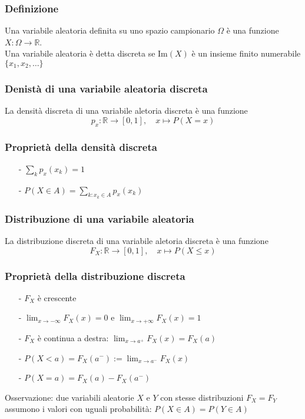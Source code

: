 \documentclass[a4paper]{article}
\newcommand\R{\mathbb{R}}     %
\begin{document}
\subsubsection*{Definizione}
Una variabile aleatoria definita su uno spazio campionario \(\Omega\) è una funzione \(X: \Omega \to \R\). \\
Una variabile aleatoria è detta discreta se \(\text{Im}(X)\) è un insieme finito numerabile \(\{x_1, x_2, \dots\}\)

\subsubsection*{Denistà di una variabile aleatoria discreta}
La densità discreta di una variabile aletoria discreta è una funzione \[p_x : \R \to [0,1], \quad x \mapsto P(X = x)\]

\subsubsection*{Proprietà della densità discreta}
\begin{itemize}[topsep=3pt, itemsep=0pt]
	\item[-] \(\displaystyle \sum_k p_x(x_k) = 1\)
	\item[-] \(\displaystyle P(X \in A) = \sum_{k : x_k \in A} p_x(x_k)\)
\end{itemize}

\subsubsection*{Distribuzione di una variabile aleatoria}
La distribuzione discreta di una variabile aletoria discreta è una funzione \[F_X : \R \to [0,1], \quad x \mapsto P(X \leq x)\]

\subsubsection*{Proprietà della distribuzione discreta}
\begin{itemize}[topsep=3pt, itemsep=0pt]
	\item[-] \(F_X\) è crescente
	\item[-] \(\displaystyle \lim_{x \to -\infty} F_X(x) = 0\) e \(\displaystyle \lim_{x \to +\infty} F_X(x) = 1\)
	\item[-] \(F_X\) è continua a destra: \(\displaystyle \lim_{x \to a^+} F_X(x) = F_X(a)\)
	\item[-] \(P(X < a) = F_X(a^-) := \lim_{x \to a^-} F_X(x)\)
	\item[-] \(P(X = a) = F_X(a) - F_X(a^-)\)
\end{itemize}
Osservazione: due variabili aleatorie \(X\) e \(Y\) con stesse distribuzioni \(F_X = F_Y\) assumono i valori con uguali probabilità:
\(P(X \in A) = P(Y \in A)\)
\end{document}
